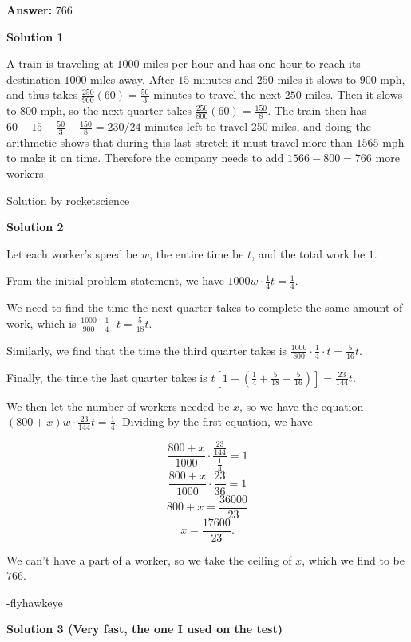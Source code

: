 \begin{enumerate}
 
 \textbf{Answer: }766



\textbf{Solution 1}

A train is traveling at $1000$ miles per hour and has one hour to reach its destination $1000$ miles away. After $15$ minutes and $250$ miles it slows to $900$ mph, and thus takes $\frac{250}{900}(60)=\frac{50}{3}$ minutes to travel the next $250$ miles. Then it slows to $800$ mph, so the next quarter takes $\frac{250}{800}(60)=\frac{150}{8}$. The train then has $60-15-\frac{50}{3}-\frac{150}{8}=230/24$ minutes left to travel 250 miles, and doing the arithmetic shows that during this last stretch it must travel more than $1565$ mph to make it on time. Therefore the company needs to add $1566-800 = \boxed{766}$ more workers.

 Solution by rocketscience

 



\textbf{Solution 2}

Let each worker's speed be $w$, the entire time be $t$, and the total work be $1$.

 
From the initial problem statement, we have $1000w\cdot\frac{1}{4}t=\frac{1}{4}$.

 
We need to find the time the next quarter takes to complete the same amount of work, which is $\frac{1000}{900}\cdot\frac{1}{4}\cdot t=\frac{5}{18}t$.

 
Similarly, we find that the time the third quarter takes is $\frac{1000}{800}\cdot\frac{1}{4}\cdot t=\frac{5}{16}t$.

 
Finally, the time the last quarter takes is $t\left[1-\left(\frac{1}{4}+\frac{5}{18}+\frac{5}{16}\right)\right]=\frac{23}{144}t$.

 
We then let the number of workers needed be $x$, so we have the equation $\left(800+x\right)w\cdot\frac{23}{144}t=\frac{1}{4}$. Dividing by the first equation, we have

 
 \[\frac{800+x}{1000}\cdot\frac{\frac{23}{144}}{\frac{1}{4}}=1\]
 \[\frac{800+x}{1000}\cdot\frac{23}{36}=1\]
 \[800+x=\frac{36000}{23}\]
 \[x=\frac{17600}{23}.\]

 We can't have a part of a worker, so we take the ceiling of $x$, which we find to be $\boxed{766}$.

 -flyhawkeye

 



\textbf{Solution 3 (Very fast, the one I used on the test)}


\end{enumerate}
